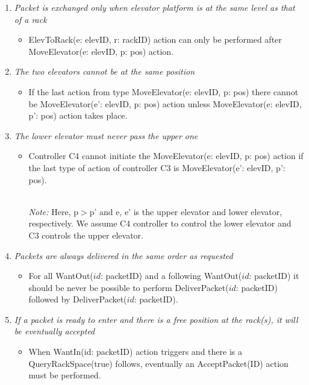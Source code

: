 \begin{enumerate}
\item \textit{Packet is exchanged only when elevator platform is at the same level as that of a rack}
	\begin{itemize}
	\item ElevToRack(e: elevID, r: rackID) action can only be performed after
	MoveElevator(e: elevID, p: pos) action.
	\end{itemize}
	
\item \textit{The two elevators cannot be at the same position}
	\begin{itemize}
	\item If the last action from type MoveElevator(e: elevID, p: pos)
	there cannot be MoveElevator(e': elevID, p: pos) action unless 
	MoveElevator(e: elevID, p': pos) action takes place.
	

	\end{itemize}
		
\item \textit{The lower elevator must never pass the upper one}
	\begin{itemize}
	\item Controller C4 cannot initiate the MoveElevator(e: elevID, p: pos) 
	action if the last type of action of controller C3 is MoveElevator(e': elevID, p': pos).
	
	
	\\
	\textit{Note:} Here, p$>$p' and e, e' is the upper elevator and 
	lower elevator, respectively. We assume C4 controller to control
	the lower elevator and C3 controls the upper elevator.
	\end{itemize}
	
\item \textit{Packets are always delivered in the same order as
	requested}	
	\begin{itemize}
	\item 
	For all WantOut($id$: packetID) and a following WantOut($id$: 
	packetID) it should be never be possible to perform
	DeliverPacket($id$: packetID) followed by DeliverPacket($id$: 
	packetID).
	\end{itemize}
	
\item \textit{If a packet is ready to enter and there is a free
	position at the rack(s), it will be eventually accepted}
	\begin{itemize}
	\item When WantIn(id: packetID) action triggers and there is a 
	QueryRackSpace(true) follows, eventually an AcceptPacket(ID) action 
	must be performed. 
	\end{itemize}
	

\end{enumerate}
